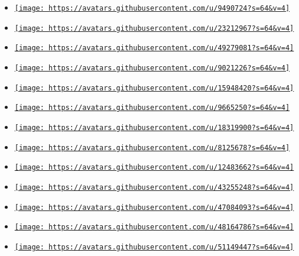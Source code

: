\begin{itemize}
\tightlist
\item
  \href{https://github.com/SUPERCILEX}{\texttt{[image: https://avatars.githubusercontent.com/u/9490724?s=64\&v=4]}}
\item
  \href{https://github.com/HarmoGlace}{\texttt{[image: https://avatars.githubusercontent.com/u/23212967?s=64\&v=4]}}
\item
  \href{https://github.com/Marmare314}{\texttt{[image: https://avatars.githubusercontent.com/u/49279081?s=64\&v=4]}}
\item
  \href{https://github.com/PgBiel}{\texttt{[image: https://avatars.githubusercontent.com/u/9021226?s=64\&v=4]}}
\item
  \href{https://github.com/barvirm}{\texttt{[image: https://avatars.githubusercontent.com/u/15948420?s=64\&v=4]}}
\item
  \href{https://github.com/Dherse}{\texttt{[image: https://avatars.githubusercontent.com/u/9665250?s=64\&v=4]}}
\item
  \href{https://github.com/Leedehai}{\texttt{[image: https://avatars.githubusercontent.com/u/18319900?s=64\&v=4]}}
\item
  \href{https://github.com/joeldierkes}{\texttt{[image: https://avatars.githubusercontent.com/u/8125678?s=64\&v=4]}}
\item
  \href{https://github.com/peng1999}{\texttt{[image: https://avatars.githubusercontent.com/u/12483662?s=64\&v=4]}}
\item
  \href{https://github.com/AlistairKeiller}{\texttt{[image: https://avatars.githubusercontent.com/u/43255248?s=64\&v=4]}}
\item
  \href{https://github.com/LaurenzV}{\texttt{[image: https://avatars.githubusercontent.com/u/47084093?s=64\&v=4]}}
\item
  \href{https://github.com/Luis-Licea}{\texttt{[image: https://avatars.githubusercontent.com/u/48164786?s=64\&v=4]}}
\item
  \href{https://github.com/SekoiaTree}{\texttt{[image: https://avatars.githubusercontent.com/u/51149447?s=64\&v=4]}}

\end{itemize}
